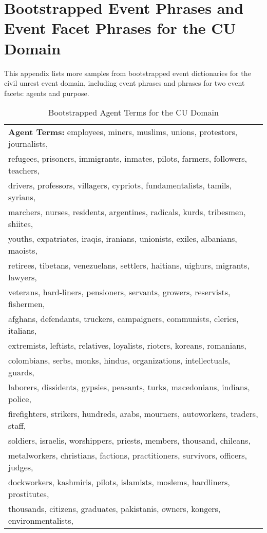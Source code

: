 \chapter{Bootstrapped Event Phrases and Event Facet Phrases for the CU Domain}
\label{Appendix:FacetPhraseForCU}
This appendix lists more samples from bootstrapped event dictionaries for the civil unrest event domain, 
including event phrases and phrases for two event facets: agents and purpose. 

\begin{table}[ht]
\small
\centering
\begin{tabular}[center]{|l|} \hline
 {\bf Agent Terms:} employees, miners, muslims, unions, protestors, journalists, \\
refugees, prisoners, immigrants, inmates, pilots, farmers, followers, teachers, \\ 
drivers, professors, villagers, cypriots, fundamentalists, tamils, syrians, \\ 
marchers, nurses, residents, argentines, radicals, kurds, tribesmen, shiites, \\
youths, expatriates, iraqis, iranians, unionists, exiles, albanians, maoists, \\
retirees, tibetans, venezuelans, settlers, haitians, uighurs, migrants, lawyers, \\
veterans, hard-liners, pensioners, servants, growers, reservists, fishermen, \\
afghans, defendants, truckers, campaigners, communists, clerics, italians, \\
extremists, leftists, relatives, loyalists, rioters, koreans, romanians, \\
colombians, serbs, monks, hindus, organizations, intellectuals, guards, \\
laborers, dissidents, gypsies, peasants, turks, macedonians, indians, police, \\
firefighters, strikers, hundreds, arabs, mourners, autoworkers, traders, staff, \\
soldiers, israelis, worshippers, priests, members, thousand, chileans, \\
metalworkers, christians, factions, practitioners, survivors, officers, judges, \\
dockworkers, kashmiris, pilots, islamists, moslems, hardliners, prostitutes, \\
thousands, citizens, graduates, pakistanis, owners, kongers, environmentalists, \\
\hline
\end{tabular}
\caption{Bootstrapped Agent Terms for the CU Domain}
\label{agent-term-table}
\end{table}

